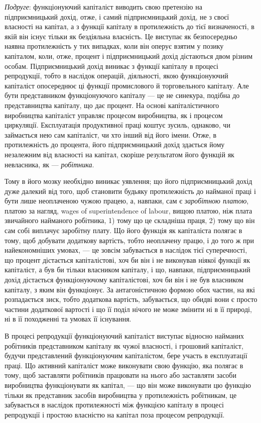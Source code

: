 \emph{Подруге}: функціонуючий капіталіст виводить свою претензію
на підприємницький дохід, отже, і самий підприємницький дохід,
не з своєї власності на капітал, а з функції капіталу в протилежність
до тієї визначеності, в якій він існує тільки як бездіяльна
власність. Це виступає як безпосередньо наявна протилежність
у тих випадках, коли він оперує взятим у позику капіталом,
коли, отже, процент і підприємницький дохід дістаються
двом різним особам. Підприємницький дохід виникає з функції
капіталу в процесі репродукції, тобто в наслідок операцій, діяльності,
якою функціонуючий капіталіст опосереднює ці функції
промислового й торговельного капіталу. Але бути представником
функціонуючого капіталу — це не синекура, подібна до представництва
капіталу, що дає процент. На основі капіталістичного
виробництва капіталіст управляє процесом виробництва, як і процесом
циркуляції. Експлуатація продуктивної праці коштує зусиль,
однаково, чи займається нею сам капіталіст, чи хто інший від його
імени. Отже, в протилежність до процента, його підприємницький
дохід здається йому незалежним від власності на капітал,
скоріше результатом його функцій як невласника, як — \emph{робітника}.

Тому в його мозку необхідно виникає уявлення; що його підприємницький
дохід дуже далекий від того, щоб становити будьяку
протилежність до найманої праці і бути лише неоплаченою чужою
працею, а, навпаки, сам є \emph{заробітною платою}, платою за нагляд,
wages of superintendence of labour, вищою платою, ніж плата звичайного
найманого робітника, 1) тому що це складніша праця, 2)
тому що він сам собі виплачує заробітну плату. Що його функція
як капіталіста полягає в тому, щоб добувати додаткову вартість,
тобто неоплачену працю, і до того ж при найекономніших умовах,
— це зовсім забувається в наслідок тієї суперечності, що процент
дістається капіталістові, хоч би він і не виконував ніякої
функції як капіталіст, а був би тільки власником капіталу, і що,
навпаки, підприємницький дохід дістається функціонуючому капіталістові,
хоч би він і не був власником капіталу, з яким він
функціонує. За антагоністичною формою обох частин, на які
розпадається зиск, тобто додаткова вартість, забувається, що
обидві вони є просто частини додаткової вартості і що її поділ
нічого не може змінити ні в її природі, ні в її походженні та
умовах її існування.

В процесі репродукції функціонуючий капіталіст виступає
відносно найманих робітників представником капіталу як чужої
власності, і грошовий капіталіст, будучи представлений функціонуючим
капіталістом, бере участь в експлуатації праці. Що
активний капіталіст може виконувати свою функцію, яка полягає
в тому, щоб заставляти робітників працювати на нього або
заставляти засоби виробництва функціонувати як капітал, — що
він може виконувати цю функцію тільки як представник засобів
виробництва у протилежність робітникам, це забувається
в наслідок протилежності між функцією капіталу в процесі
репродукції і простою власністю на капітал поза процесом
репродукції.

